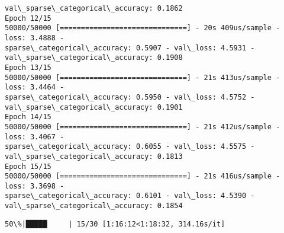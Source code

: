 \documentclass[11pt]{article}
\begin{document}
\begin{Verbatim}[commandchars=\\\{\}]
val\_sparse\_categorical\_accuracy: 0.1862
Epoch 12/15
50000/50000 [==============================] - 20s 409us/sample - loss: 3.4888 -
sparse\_categorical\_accuracy: 0.5907 - val\_loss: 4.5931 -
val\_sparse\_categorical\_accuracy: 0.1908
Epoch 13/15
50000/50000 [==============================] - 21s 413us/sample - loss: 3.4464 -
sparse\_categorical\_accuracy: 0.5950 - val\_loss: 4.5752 -
val\_sparse\_categorical\_accuracy: 0.1901
Epoch 14/15
50000/50000 [==============================] - 21s 412us/sample - loss: 3.4067 -
sparse\_categorical\_accuracy: 0.6055 - val\_loss: 4.5575 -
val\_sparse\_categorical\_accuracy: 0.1813
Epoch 15/15
50000/50000 [==============================] - 21s 416us/sample - loss: 3.3698 -
sparse\_categorical\_accuracy: 0.6101 - val\_loss: 4.5390 -
val\_sparse\_categorical\_accuracy: 0.1854
    \end{Verbatim}

    \begin{Verbatim}[commandchars=\\\{\}]
 50\%|█████     | 15/30 [1:16:12<1:18:32, 314.16s/it]
    \end{Verbatim}
\end{document}
